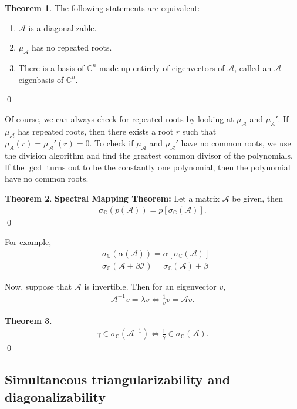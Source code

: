 \documentclass{article}
\theoremstyle{definition}
\newtheorem{thm}{Theorem}[section]
\newcommand{\C}{\mathbb{C}}
\newcommand{\A}{\mathcal{A}}
\begin{document}
\begin{thm}
	The following statements are equivalent:
	\begin{enumerate}
		\item $\A$ is a diagonalizable. 
		\item $\mu_\A$ has no repeated roots.
		\item There is a basis of $\C^n$ made up entirely of eigenvectors of $\A$, called an $\A$-eigenbasis of $\C^n$.
	\end{enumerate} \qed
\end{thm}

Of course, we can always check for repeated roots by looking at $\mu_\A$ and $\mu_A'$. If $\mu_\A$ has repeated roots, then there exists a root $r$ such that $\mu_A(r) = \mu_\A'(r) = 0$. To check if $\mu_\A$ and $\mu_\A'$ have no common roots, we use the division algorithm and find the greatest common divisor of the polynomials. If the $\gcd$ turns out to be the constantly one polynomial, then the polynomial have no common roots. 

\begin{thm}
	\textbf{Spectral Mapping Theorem:} Let a matrix $\A$ be given, then
	\begin{align*}
	\sigma_\C(p(\A)) = p \left[ \sigma_\C(\A)\right].
	\end{align*}\qed
\end{thm}


For example,
\begin{align*}
&\sigma_\C(\alpha(\A)) = \alpha \left[\sigma_\C(\A)\right]\\
&\sigma_\C(\A + \beta\mathcal{I}) = \sigma_\C(\A) + \beta
\end{align*}

Now, suppose that $\A$ is invertible. Then for an eigenvector $v$,
\begin{align*}
\A^{-1}v = \lambda v \iff \frac{1}{v}v = \A v.
\end{align*}

\begin{thm}
	\begin{align*}
	\gamma \in \sigma_\C(\A^{-1}) \iff \frac{1}{\gamma} \in \sigma_\C(\A).
	\end{align*}\qed
\end{thm}



\subsection{Simultaneous triangularizability and diagonalizability}
\end{document}
